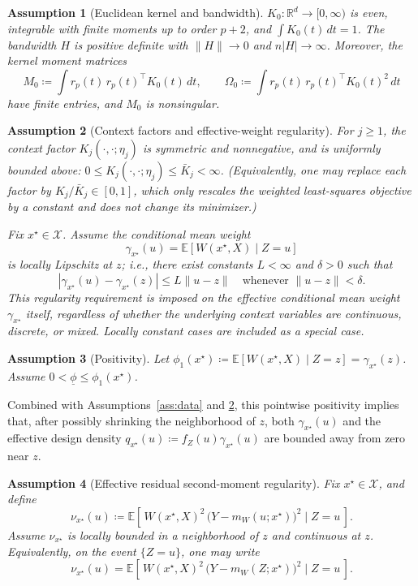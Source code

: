 \documentclass[final,1p,times,authoryear]{elsarticle}
\newtheorem{assumption}{Assumption}
\begin{document}
\begin{assumption}[Euclidean kernel and bandwidth]
\label{ass:k0}
\(K_0:\mathbb{R}^d\to[0,\infty)\) is even, integrable with finite moments up to order \(p+2\), and
\(\int K_0(t)\,dt=1\). The bandwidth \(H\) is positive definite with \(\|H\|\to0\) and \(n|H|\to\infty\).
Moreover, the kernel moment matrices
\[
M_0\coloneqq \int r_p(t)\,r_p(t)^\top K_0(t)\,dt,
\qquad
\Omega_0\coloneqq \int r_p(t)\,r_p(t)^\top K_0(t)^2\,dt
\]
have finite entries, and \(M_0\) is nonsingular.
\end{assumption}

\begin{assumption}[Context factors and effective-weight regularity]
\label{ass:context}
For \(j\ge 1\), the context factor \(K_j(\cdot,\cdot;\eta_j)\) is symmetric and nonnegative, and is
uniformly bounded above: \(0\le K_j(\cdot,\cdot;\eta_j)\le \bar K_j<\infty\). (Equivalently, one may replace each
factor by \(K_j/\bar K_j\in[0,1]\), which only rescales the weighted least-squares objective by a constant and does
not change its minimizer.)

Fix \(x^\star\in\mathcal{X}\). Assume the conditional mean weight
\[
\gamma_{x^\star}(u)=\mathbb{E}[W(x^\star,X)\mid Z=u]
\]
is locally Lipschitz at \(z\); i.e., there exist constants \(L<\infty\) and \(\delta>0\) such that
\[
|\gamma_{x^\star}(u)-\gamma_{x^\star}(z)| \le L\|u-z\| \quad \text{whenever } \|u-z\|<\delta.
\]
This regularity requirement is imposed on the effective conditional mean weight \(\gamma_{x^\star}\) itself, regardless of whether the underlying context variables are continuous, discrete, or mixed. Locally constant cases are included as a special case.
\end{assumption}

\begin{assumption}[Positivity]
\label{ass:positivity}
Let \(\phi_1(x^\star)\coloneqq \mathbb{E}[W(x^\star,X)\mid Z=z]=\gamma_{x^\star}(z)\). Assume
\(0<\underline{\phi}\le \phi_1(x^\star)\).
\end{assumption}
Combined with Assumptions~\ref{ass:data} and \ref{ass:context}, this pointwise positivity implies that, after possibly shrinking the neighborhood of \(z\), both \(\gamma_{x^\star}(u)\) and the effective design density \(q_{x^\star}(u)\coloneqq f_Z(u)\gamma_{x^\star}(u)\) are bounded away from zero near \(z\).

\begin{assumption}[Effective residual second-moment regularity]
\label{ass:variance_moment}
Fix \(x^\star\in\mathcal{X}\), and define
\[
\nu_{x^\star}(u)\coloneqq
\mathbb{E}\!\left[\,W(x^\star,X)^2\,\big(Y-m_W(u;x^\star)\big)^2\mid Z=u\,\right].
\]
Assume \(\nu_{x^\star}\) is locally bounded in a neighborhood of \(z\) and continuous at \(z\). Equivalently, on the event \(\{Z=u\}\), one may write
\[
\nu_{x^\star}(u)=
\mathbb{E}\!\left[\,W(x^\star,X)^2\,\big(Y-m_W(Z;x^\star)\big)^2\mid Z=u\,\right].
\]
\end{assumption}
\end{document}
